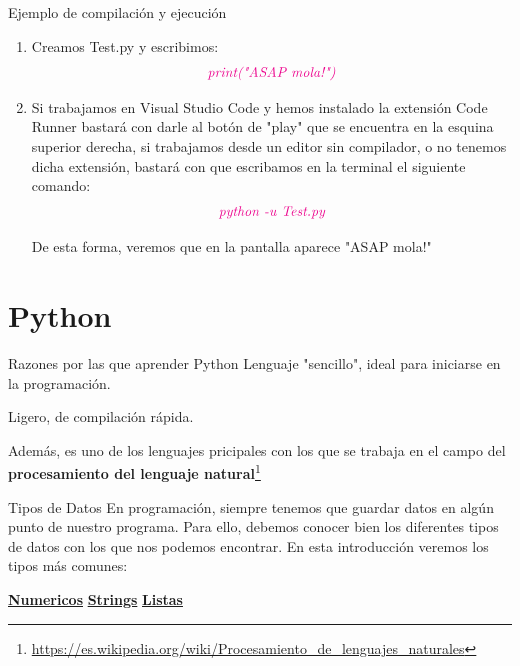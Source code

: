 \documentclass{beamer}
\begin{document}
\begin{frame}{Ejemplo de compilación y ejecución}
\begin{enumerate}
\item Creamos Test.py y escribimos: 
\begin{gather}
\color{magenta}\textit{print("ASAP mola!")}
\end{gather}
\item Si trabajamos en Visual Studio Code y hemos instalado la extensión Code Runner bastará con darle al botón de "play" que se encuentra en la esquina superior derecha, si trabajamos desde un editor sin compilador, o no tenemos dicha extensión, bastará con que escribamos en la terminal el siguiente comando:
\begin{gather}
\color{magenta}\textit{python -u Test.py}
\end{gather}

De esta forma, veremos que en la pantalla aparece "ASAP mola!"
\end{enumerate}
\end{frame}
\section{Python}
\begin{frame}{Razones por las que aprender Python}
\setlength{\parskip}{8mm} %
Lenguaje "sencillo", ideal para iniciarse en la programación.

Ligero, de compilación rápida.

Además, es uno de los lenguajes pricipales con los que se trabaja en el campo del \textbf{procesamiento del lenguaje natural}\footnote{\url{https://es.wikipedia.org/wiki/Procesamiento_de_lenguajes_naturales}}
\end{frame}
\begin{frame}{Tipos de Datos}
En programación, siempre tenemos que guardar datos en algún punto de nuestro programa. Para ello, debemos conocer bien los diferentes tipos de datos con los que nos podemos encontrar. En esta introducción veremos los tipos más comunes:
\vspace{1cm}

\centering\hyperlink{datos:numericos}{\textbf{Numericos}}
\hspace{3cm} \hyperlink{datos:strings}{\textbf{Strings}}
\hspace{3cm} \hyperlink{datos:listas}{\textbf{Listas}}
\end{frame}
\end{document}
